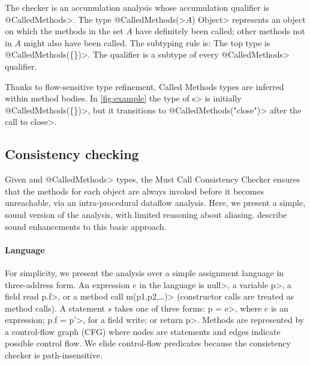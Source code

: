 The checker is an accumulation analysis whose accumulation qualifier is \<@CalledMethods>.
The type \<@CalledMethods(>$A$\<) Object>
represents an object on which the methods in the set $A$ have definitely
been called; other methods not in $A$ might also have been called.
The subtyping
rule is:
The top type is \<@CalledMethods(\{\})>.
The qualifier \CalledMethodsBottom is a subtype of every \<@CalledMethods> qualifier.

Thanks to flow-sensitive type refinement,
Called Methods types are inferred within method bodies.
In \cref{fig:example} the type of \<s> is initially \<@CalledMethods(\{\})>,
but it transitions to \<@CalledMethods("close")> after the call to \<close>.


\subsection{Consistency checking}
\label{sec:must-call-invoked}





Given \MustCall and \<@CalledMethods> types, the Must
Call Consistency Checker ensures that the \MustCall methods for each object
are always invoked before it becomes unreachable,
via an intra-procedural dataflow analysis.  Here, we present
a simple, sound version of the analysis, with limited reasoning about aliasing.
describe sound enhancements to this basic approach.

\paragraph{Language} For simplicity, we present the analysis over a simple
assignment language in three-address form.  An expression $e$ in the language is
\<null>, a variable \<p>, a field read \<p.f>, or a method call \<m(p1,p2,\ldots)> (constructor
calls are treated as method calls).  A statement $s$ takes one of three forms:
\<p = e>, where $e$ is an expression; \<p.f = p'>, for a field write; or
\<return p>.  Methods are represented by a control-flow graph (CFG) where nodes
are statements and edges indicate possible control flow.  We elide control-flow
predicates because the consistency checker is path-insensitive.


